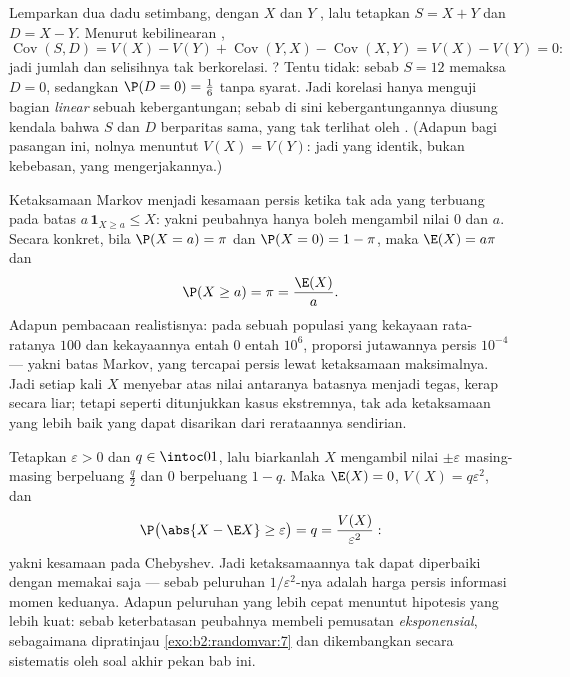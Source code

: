 \begin{example}\label{ex:b2:randomvar:sumdiff}
Lemparkan dua dadu setimbang, dengan $X$ dan $Y$ , lalu tetapkan $S = X +
Y$ dan $D = X - Y$. Menurut kebilinearan ,
\[
\operatorname{Cov}(S, D) = V(X) - V(Y) +
\operatorname{Cov}(Y, X) - \operatorname{Cov}(X, Y) = V(X) -
V(Y) = 0 :
\]
jadi jumlah dan selisihnya tak berkorelasi. ? Tentu
tidak: sebab $S = 12$ memaksa $D = 0$, sedangkan $\P(D = 0) =
\frac16$ tanpa syarat. Jadi korelasi hanya menguji bagian
\emph{linear} sebuah kebergantungan; sebab di sini kebergantungannya
diusung kendala bahwa $S$ dan $D$ berparitas sama,
yang tak terlihat oleh . (Adapun bagi pasangan ini, 
nolnya menuntut $V(X) = V(Y)$: jadi  yang identik,
bukan kebebasan, yang mengerjakannya.)
\end{example}

\begin{example}\label{ex:b2:randomvar:markovsharp}
Ketaksamaan Markov menjadi kesamaan persis ketika tak ada yang
terbuang pada batas $a\,\mathbf 1_{X\geq a} \leq X$: yakni
peubahnya hanya boleh mengambil nilai $0$ dan $a$. Secara konkret,
bila $\P(X = a) = \pi$ dan $\P(X = 0) = 1 - \pi$, maka $\E(X)
= a\pi$ dan
\[
\P(X \geq a) = \pi = \frac{\E(X)}{a} .
\]
Adapun pembacaan realistisnya: pada sebuah populasi yang kekayaan rata-ratanya
$100$ dan kekayaannya entah $0$ entah $10^6$, proporsi
jutawannya persis $10^{-4}$ --- yakni batas Markov, yang tercapai
persis lewat ketaksamaan maksimalnya. Jadi setiap kali $X$ menyebar atas
nilai antaranya batasnya menjadi tegas, kerap secara liar;
tetapi seperti ditunjukkan kasus ekstremnya, tak ada ketaksamaan yang lebih baik yang dapat
disarikan dari rerataannya sendirian.
\end{example}

\begin{example}\label{ex:b2:randomvar:chebsharp}
Tetapkan $\varepsilon > 0$ dan $q \in \intoc01$, lalu biarkanlah $X$ mengambil
nilai $\pm\varepsilon$ masing-masing berpeluang $\frac q2$ dan
$0$ berpeluang $1 - q$. Maka $\E(X) = 0$, $V(X) =
q\varepsilon^2$, dan
\[
\P\bigl(\abs{X - \E X} \geq \varepsilon\bigr) = q
= \frac{V(X)}{\varepsilon^2} :
\]
yakni kesamaan pada Chebyshev. Jadi ketaksamaannya tak dapat diperbaiki
dengan memakai  saja --- sebab peluruhan $1/\varepsilon^2$-nya adalah
harga persis informasi momen keduanya. Adapun peluruhan yang lebih cepat
menuntut hipotesis yang lebih kuat: sebab keterbatasan peubahnya
membeli pemusatan \emph{eksponensial}, sebagaimana dipratinjau
\cref{exo:b2:randomvar:7} dan dikembangkan secara sistematis
oleh soal akhir pekan bab ini.
\end{example}

